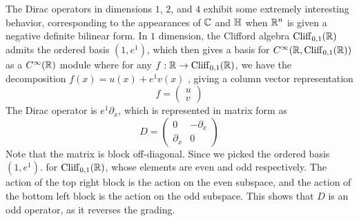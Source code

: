 The Dirac operators in dimensions $1$, $2$, and $4$ exhibit some extremely
interesting behavior, corresponding to the appearances of $\mathbb{C}$ and $\mathbb{H}$
when $\mathbb{R}^n$ is given a negative definite bilinear form. In $1$ dimension,
the Clifford algebra $\operatorname{Cliff}_{0,1}(\mathbb{R})$ admits the ordered basis $(1,e^1)$, which
then gives a basis for $C^\infty(\mathbb{R}, \operatorname{Cliff}_{0,1}(\mathbb{R}))$ as a
$C^\infty(\mathbb{R})$ module where for any $f : \mathbb{R} \to \operatorname{Cliff}_{0,1}(\mathbb{R})$, we have the
decomposition $f(x) = u(x) + e^1 v(x)$ , giving a column vector representation
\[
f = \begin{pmatrix}
u \\
v
\end{pmatrix}
\]
The Dirac operator is $e^1\partial_x$, which is represented in matrix form as
\[
D = \begin{pmatrix}
0 & -\partial_x \\
\partial_x & 0
\end{pmatrix}
\]
Note that the matrix is block off-diagonal. Since we picked the ordered basis $(1,e^1)$.
for $\operatorname{Cliff}_{0,1}(\mathbb{R})$, whose elements are even and odd respectively. The action
of the top right block is the action on the even subspace, and the action of
the bottom left block is the action on the odd subspace. This
shows that $D$ is an odd operator, as it reverses the grading. \\

